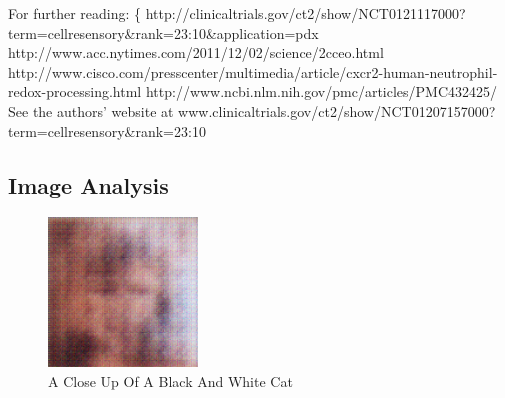 \documentclass{article}%
\begin{document}
For further reading:\newline%
\{\newline%
http://clinicaltrials.gov/ct2/show/NCT0121117000?term=cellresensory\&rank=23:10\&application=pdx\newline%
http://www.acc.nytimes.com/2011/12/02/science/2cceo.html\newline%
http://www.cisco.com/presscenter/multimedia/article/cxcr2{-}human{-}neutrophil{-}redox{-}processing.html\newline%
http://www.ncbi.nlm.nih.gov/pmc/articles/PMC432425/\newline%
See the authors' website at www.clinicaltrials.gov/ct2/show/NCT01207157000?term=cellresensory\&rank=23:10

%
\subsection{Image Analysis}%
\label{subsec:ImageAnalysis}%


\begin{figure}[h!]%
\centering%
\includegraphics[width=150px]{500_fake_images/samples_5_251.png}%
\caption{A Close Up Of A Black And White Cat}%
\end{figure}

%
\end{document}
